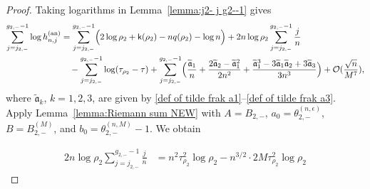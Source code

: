 \documentclass[a4paper]{article}
\numberwithin{equation}{section}
\begin{document}
\begin{proof}

Taking logarithms in Lemma~\ref{lemma:j2- j g2--1} gives
\begin{align*}
 \sum_{j=j_{2,-}}^{g_{2,-}-1}\log h_{n,j}^{(\mathrm{an})}  
&=
 \sum_{j=j_{2,-}}^{g_{2,-}-1}
 \Bigl( 
2\log\rho_2+\mathsf{k}(\rho_2)-nq(\rho_2)-\log n
 \Bigr)
  +2n\log\rho_2\sum_{j=j_{2,-}}^{g_{2,-}-1} \frac{j}{n}
 \\
 &\quad
-\sum_{j=j_{2,-}}^{g_{2,-}-1}\log(\tau_{\rho_2}-\tau)
 + \sum_{j=j_{2,-}}^{g_{2,-}-1}
 \Bigl( 
\frac{\widetilde{\mathfrak{a}}_1}{n}+\frac{2\widetilde{\mathfrak{a}}_2-\widetilde{\mathfrak{a}}_1^2}{2n^2}+\frac{\widetilde{\mathfrak{a}}_1^3-3\widetilde{\mathfrak{a}}_1\widetilde{\mathfrak{a}}_2+3\widetilde{\mathfrak{a}}_3}{3n^3}
 \Bigr)+\mathcal{O}(\frac{\sqrt{n}}{M^7}),
\end{align*}
where $\widetilde{\mathfrak a}_k$, $k=1,2,3$, are given by \eqref{def of tilde frak a1}--\eqref{def of tilde frak a3}. Apply Lemma~\ref{lemma:Riemann sum NEW} with $A=B_{2,-}$, $a_0=\theta_{2,-}^{(n,\epsilon)}$, $B=B_{2,-}^{(M)}$, and $b_0=\theta_{2,-}^{(n,M)}-1$. We obtain

\begin{align*}
2n\log\rho_2\sum_{j=j_{2,-}}^{g_{2,-}-1}
 \frac{j}{n}
 &=
 n^2\tau_{\rho_2}^2\log \rho_2
-n^{3/2}\cdot 2M\tau_{\rho_2}^2\log \rho_2

\end{align*}
\end{proof}
\end{document}
